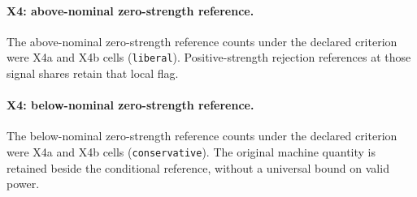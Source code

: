 \paragraph{X4: above-nominal zero-strength reference.}
The above-nominal zero-strength reference counts under the declared criterion were  X4a and  X4b cells (\texttt{liberal}).
Positive-strength rejection references at those signal shares retain that local flag.

\paragraph{X4: below-nominal zero-strength reference.}
The below-nominal zero-strength reference counts under the declared criterion were  X4a and  X4b cells (\texttt{conservative}).
The original machine quantity is retained beside the conditional reference, without a universal bound on valid power.

